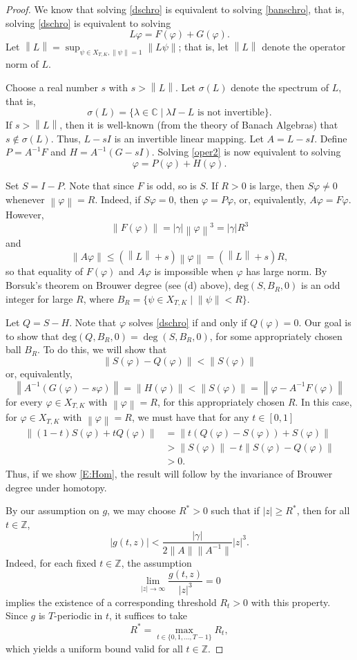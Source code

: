 \documentclass[10pt,a4paper]{amsart}
\newcommand{\ds}{\displaystyle}
\newcommand{\C}{\mathbb{C}}
\newcommand{\norm}[1]{\left \lVert #1 \right \rVert}
\newcommand{\be}{\begin{equation}}
\newcommand{\ee}{\end{equation}}
\newcommand{\bes}{\begin{equation*}}
\newcommand{\ees}{\end{equation*}}
\newcommand{\lam}{\lambda}
\newcommand{\bdeg}{\text{deg}}
\renewcommand{\phi}{\varphi}
\numberwithin{equation}{section}
\begin{document}
\begin{proof}

We know that solving \eqref{dschro} is equivalent to solving \eqref{banschro}, that is, solving \eqref{dschro} is equivalent to solving 
\be\label{oper2}
L\phi=F(\phi)+G(\phi).
\ee
Let $\ds\norm{L}=\sup_{\psi\in X_{T,K}, \norm{\psi}=1}\norm{L\psi}$; that is, let $\norm{L}$ denote the operator norm of $L$.

Choose a real number $s$ with $s>\norm{L}$. Let $\sigma(L)$ denote the spectrum of $L$, that is, 
\bes
\sigma(L)=\{\lam\in \C\mid \lam I-L \text{ is not invertible}\}.
\ees
If $s>\norm{L}$, then it is well-known (from the theory of Banach Algebras) that $s\not\in \sigma(L)$. Thus,  $L-sI$ is an invertible linear mapping.  Let $A=L-sI$. Define {$P=A^{-1}F$} and $H=A^{-1}(G-sI)$. Solving \eqref{oper2} is now equivalent to solving 
\be
\phi=P(\phi)+H(\phi).
\ee

Set $S=I-P$.  Note that since $F$ is odd, so is $S$.  If $R>0$ is large, then $S \phi\neq 0$ whenever $\norm{\phi}=R$.  Indeed, if $S\phi=0$, then {$\phi=P\phi$}, or, equivalently, $A\phi=F\phi$.  However, 
\bes
\norm{F(\phi)}=|\gamma|\norm{\phi}^3=|\gamma|R^3
\ees
 and 
\bes\norm{A\phi}\leq (\norm{L}+s)\norm{\phi}=(\norm{L}+s)R,
\ees
so that equality of $F(\phi)$ and $A\phi$ is impossible when $\phi$ has large norm.
By Borsuk's theorem on Brouwer degree (see (d) above), $\bdeg(S,B_R,0)$ is an odd integer for large $R$, where $B_R=\{\psi\in X_{T,K}\mid \norm{\psi}<R\}$.  

Let $Q=S-H$.  Note that $\phi$ solves \eqref{dschro} if and only if $Q(\phi)=0$.  Our goal is to show that $\bdeg(Q,B_R,0)=\deg(S,B_R,0)$, for some appropriately chosen ball $B_R$.  To do this, we will show that 
\bes
\norm{S(\phi)-Q(\phi)}<\norm{S(\phi)}
\ees
or, equivalently,
\be\label{E:Hom}
\norm{A^{-1}(G(\phi)-s\phi)}=\norm{H(\phi)}<\norm{S(\phi)}=\norm{\phi-A^{-1}F(\phi)}
\ee
for every $\phi\in X_{T,K}$ with $\norm{\phi}=R$, for this appropriately chosen $R$.  In this case, for $\phi\in X_{T,K}$ with $\norm{\phi}=R$, we must have that for any $t\in [0,1]$
\bes
\begin{split}
\norm{(1-t)S(\phi)+tQ(\phi)}&=\norm {t(Q(\phi)-S(\phi))+S(\phi)}\\&>\norm{S(\phi)}-t\norm{S(\phi)-Q(\phi)}\\&>0.
\end{split}
\ees
Thus, if we show \eqref{E:Hom}, the result will follow by the invariance of Brouwer degree under homotopy. 

By our assumption on $g$, we may choose $R^*>0$ such that if $|z|\geq R^*$, then for all $t\in \mathbb{Z}$,
\[
|g(t,z)|<\frac{|\gamma|}{2\|A\|\|A^{-1}\|}|z|^3.
\]
Indeed, for each fixed $t\in\mathbb{Z}$, the assumption
\[
\lim_{|z|\to\infty}\frac{g(t,z)}{|z|^3}=0
\]
implies the existence of a corresponding threshold $R_t>0$ with this property. Since $g$ is $T$-periodic in $t$, it suffices to take
\[
R^*=\max_{t\in\{0,1,\dots,T-1\}} R_t,
\]
which yields a uniform bound valid for all $t\in\mathbb{Z}$. 


\end{proof}
\end{document}
